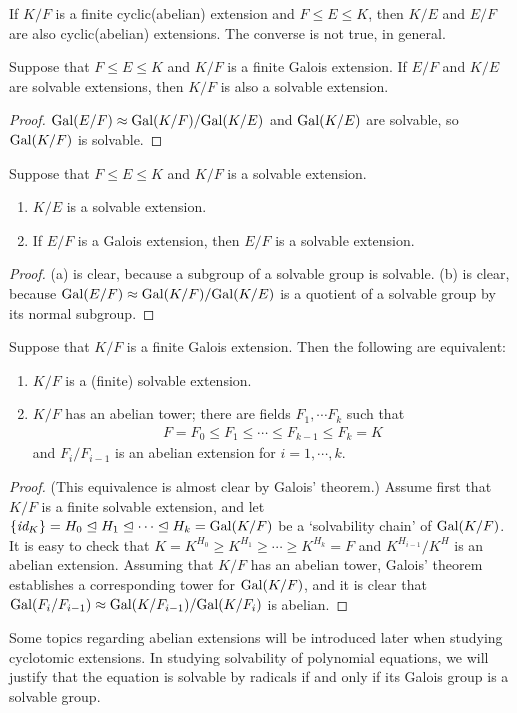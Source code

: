 \begin{obs}
    If $K/F$ is a finite cyclic(abelian) extension and $F\leq E\leq K$, then $K/E$ and $E/F$ are also cyclic(abelian) extensions.
    The converse is not true, in general.
\end{obs}
\begin{prop}
    Suppose that $F\leq E\leq K$ and $K/F$ is a finite Galois extension.
    If $E/F$ and $K/E$ are solvable extensions, then $K/F$ is also a solvable extension.
\end{prop}
\begin{proof}
    ${\textrm{Gal}({E/F})}\approx{{\textrm{Gal}({K/F})}}/{{\textrm{Gal}({K/E})}}$ and ${\textrm{Gal}({K/E})}$ are solvable, so ${\textrm{Gal}({K/F})}$ is solvable.
\end{proof}
\begin{prop}
    Suppose that $F\leq E\leq K$ and $K/F$ is a solvable extension.
    \begin{enumerate}
        \item[(a)]
        {
            $K/E$ is a solvable extension.
        }
        \item[(b)]
        {
            If $E/F$ is a Galois extension, then $E/F$ is a solvable extension.
        }
    \end{enumerate}
\end{prop}
\begin{proof}
    (a) is clear, because a subgroup of a solvable group is solvable.
    (b) is clear, because ${\textrm{Gal}({E/F})}\approx{{\textrm{Gal}({K/F})}}/{{\textrm{Gal}({K/E})}}$ is a quotient of a solvable group by its normal subgroup.
\end{proof}
\begin{prop}
    Suppose that $K/F$ is a finite Galois extension.
    Then the following are equivalent:
    \begin{enumerate}
        \item[(a)]
        {
            $K/F$ is a (finite) solvable extension.
        }
        \item[(b)]
        {
            $K/F$ has an abelian tower; there are fields $F_1, \cdots F_k$ such that
            \begin{align*}
                F=F_0\leq F_1\leq \cdots\leq F_{k-1}\leq F_k=K
            \end{align*}
            and $F_i/F_{i-1}$ is an abelian extension for $i=1, \cdots, k$.
        }
    \end{enumerate}
\end{prop}
\begin{proof}
    (This equivalence is almost clear by Galois' theorem.)
    Assume first that $K/F$ is a finite solvable extension, and let $\{\textit{id}_{K}\}=H_0\trianglelefteq H_1\trianglelefteq \cdots\trianglelefteq H_k={\textrm{Gal}({K/F})}$ be a `solvability chain' of ${\textrm{Gal}({K/F})}$.
    It is easy to check that $K=K^{H_0}\geq K^{H_1}\geq \cdots\geq K^{H_k}=F$ and $K^{H_{i-1}}/K^H$ is an abelian extension.
    Assuming that $K/F$ has an abelian tower, Galois' theorem establishes a corresponding tower for ${\textrm{Gal}({K/F})}$, and it is clear that ${\textrm{Gal}({F_i/F_{i-1}})}\approx{\textrm{Gal}({K/F_{i-1}})}/{\textrm{Gal}({K/F_i})}$ is abelian.
\end{proof}

Some topics regarding abelian extensions will be introduced later when studying cyclotomic extensions.
In studying solvability of polynomial equations, we will justify that the equation is solvable by radicals if and only if its Galois group is a solvable group.